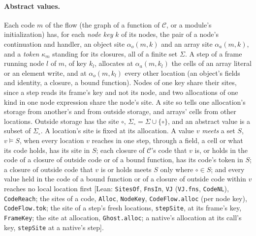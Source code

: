\documentclass[10pt,a4paper]{article}
\theoremstyle{definition}
\theoremstyle{remark}
\newcommand{\lean}[1]{\texttt{\small #1}}
\newcommand{\status}[1]{\textsf{\small[#1]}}
\newcommand{\cC}{\mathcal{C}}
\begin{document}
\paragraph{Abstract values.} Each code $m$ of the flow (the graph of a
function of $\cC$, or a module's initialization) has, for each
\emph{node key} $k$ of its nodes, the pair of a node's continuation and
handler, an object site $\alpha_o(m,k)$ and an array site
$\alpha_a(m,k)$, and a \emph{token} $\kappa_m$ standing for its closures,
all of a finite set $\Sigma$. A step of a frame running node $l$ of $m$,
of key $k_l$, allocates at $\alpha_a(m,k_l)$ the cells of an array literal
or an element write, and at $\alpha_o(m,k_l)$ every other location (an
object's fields and identity, a closure, a bound function). Nodes of one
key share their sites, since a step reads its frame's key and not its
node, and two allocations of one kind in one node expression share the
node's site. A site so tells one allocation's storage from another's and
from outside storage, and arrays' cells from other locations. Outside
storage has the site $\circ$, $\Sigma_\circ=\Sigma\cup\{\circ\}$, and an
abstract value is a subset of $\Sigma_\circ$. A location's site is fixed
at its allocation. A value $v$ \emph{meets} a set $S$, $v\models S$, when
every location $v$ reaches in one step, through a field, a cell or what
its code holds, has its site in $S$; each closure of $\cC$'s code that $v$
is, or holds in the code of a closure of outside code or of a bound
function, has its code's token in $S$; a closure of outside code that $v$
is or holds meets $S$ only where $\circ\in S$; and every value held in the
code of a bound function or of a closure of outside code within $v$
reaches no local location first
\status{Lean: \lean{SitesOf}, \lean{FnsIn}, \lean{VJ} (\lean{VJ.fns}, \lean{CodeNL}), \lean{CodeReach}; the sites of a code, \lean{Alloc}, \lean{NodeKey}, \lean{CodeFlow.alloc} (per node key), \lean{CodeFlow.tok}; the site of a step's fresh locations, \lean{stepSite}, at its frame's key, \lean{FrameKey}; the site at allocation, \lean{Ghost.alloc}; a native's allocation at its call's key, \lean{stepSite} at a native's step}.
\end{document}

